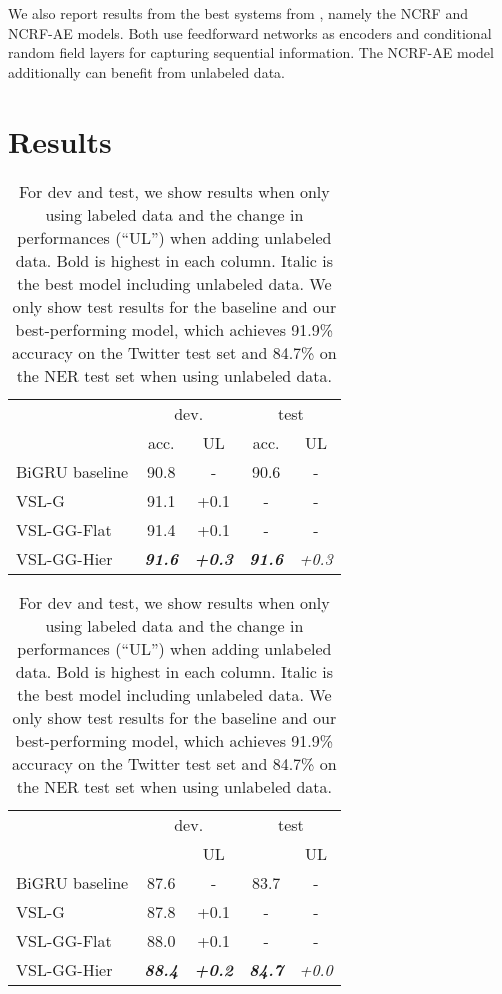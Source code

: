 \documentclass[11pt,a4paper]{article}
\newcommand{\vsmg}{VSL-G\xspace}
\newcommand{\vsmggflat}{VSL-GG-Flat\xspace}
\newcommand{\vsmgghier}{VSL-GG-Hier\xspace}
\begin{document}
We also report results from the best systems from \citet{zhang2017semi}, namely the NCRF and NCRF-AE models. Both use feedforward networks as encoders and conditional random field layers for capturing sequential information. The NCRF-AE model additionally can benefit from unlabeled data.


\section{Results}

\begin{table}[t]
\setlength{\tabcolsep}{3pt}
\begin{subtable}{.5\textwidth}
\centering
\begin{tabular}{l|c|c|c|c}
        & \multicolumn{2}{c|}{dev.} & \multicolumn{2}{c}{test} \\
        & \multicolumn{1}{c}{acc.} & UL & \multicolumn{1}{c}{acc.} & UL \\
\hline
BiGRU baseline     & 90.8  & -    & 90.6 & -  \\
\vsmg              & 91.1  &  +0.1 &   -  & -  \\
\vsmggflat            & 91.4  &  +0.1 &   -  & -  \\
\vsmgghier            & \textit{\textbf{91.6}}  & \textit{\textbf{+0.3}}  &   \textit{\textbf{91.6}}   &  \textit{+0.3} \\
\end{tabular}
\caption{Twitter tagging accuracies (\%)}
\label{twitter-res}
\end{subtable}

\begin{subtable}{.5\textwidth}
\centering
\begin{tabular}{l|c|c|c|c}
        & \multicolumn{2}{c|}{dev.} & \multicolumn{2}{c}{test} \\
        & \multicolumn{1}{c}{} & UL & \multicolumn{1}{c}{} & UL \\
\hline
BiGRU baseline     & 87.6  & -    & 83.7 & -  \\
\vsmg              & 87.8  & +0.1  &   -  & -  \\
\vsmggflat         & 88.0  & +0.1  &   -  & -  \\
\vsmgghier         & \textit{\textbf{88.4}}  & \textit{\textbf{+0.2}} &  \textit{\textbf{84.7}}    &    \textit{+0.0} \\
\end{tabular}
\caption{NER  score (\%)}
\label{ner-res}
\end{subtable}
\caption{For dev and test, we show results when only using labeled data and the change in performances (``UL'') when adding unlabeled data. Bold is highest in each column. Italic is the best model including unlabeled data. We only show test results for the baseline and our best-performing model, which achieves 91.9\% accuracy on the Twitter test set and 84.7\%  on the NER test set when using unlabeled data.}
\end{table}
\end{document}
